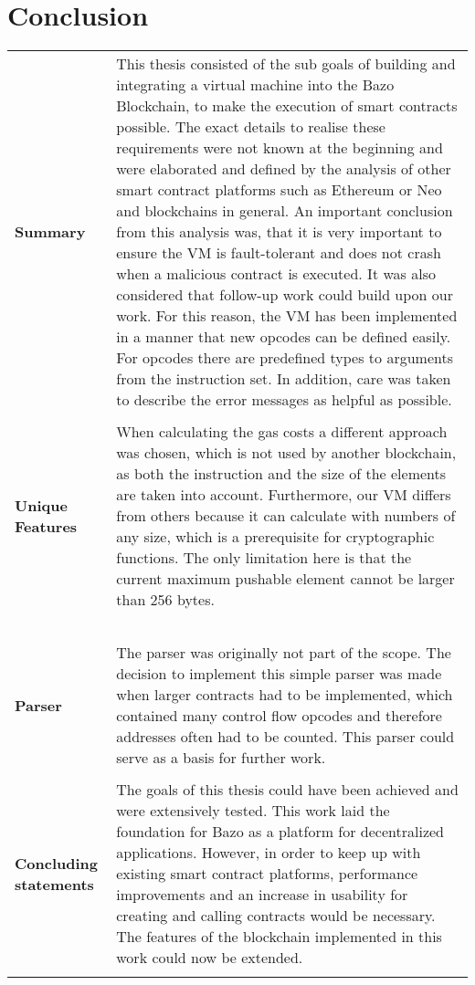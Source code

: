 \chapter{Conclusion}
\label{futureworkandconclusions}

\begin{tabular}[t]{ p{3cm} p{12.5cm}}
\raggedright
\textbf{Summary} & 
This thesis consisted of the sub goals of building and integrating a virtual machine into the Bazo Blockchain, to make the execution of smart contracts possible. The exact details to realise these requirements were not known at the beginning and were elaborated and defined by the analysis of other smart contract platforms such as Ethereum or Neo and blockchains in general. An important conclusion from this analysis was, that it is very important to ensure the VM is fault-tolerant and does not crash when a malicious contract is executed. It was also considered that follow-up work could build upon our work. For this reason, the VM has been implemented in a manner that new opcodes can be defined easily. For opcodes there are predefined types to arguments from the instruction set. In addition, care was taken to describe the error messages as helpful as possible. \\ \\

\raggedright
\textbf{Unique Features} & 
When calculating the gas costs a different approach was chosen, which is not used by another blockchain, as both the instruction and the size of the elements are taken into account. Furthermore, our VM differs from others because it can calculate with numbers of any size, which is a prerequisite for cryptographic functions. The only limitation here is that the current maximum pushable element cannot be larger than 256 bytes. \\ \\

\raggedright
\textbf{Parser} &
The parser was originally not part of the scope. The decision to implement this simple parser was made when larger contracts had to be implemented, which contained many control flow opcodes and therefore addresses often had to be counted. This parser could serve as a basis for further work. \\ \\

\raggedright
\textbf{Concluding statements } &
The goals of this thesis could have been achieved and were extensively tested. This work laid the foundation for Bazo as a platform for decentralized applications. However, in order to keep up with existing smart contract platforms, performance improvements and an increase in usability for creating and calling contracts would be necessary. The features of the blockchain implemented in this work could now be extended. \\ \\
\end{tabular}


